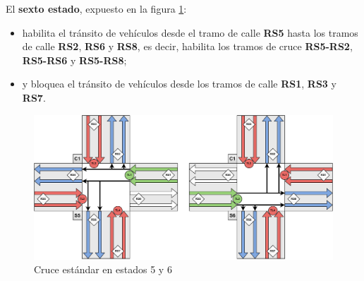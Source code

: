 El \textbf{sexto estado}, expuesto en la figura \ref{fig:cruce_estandar_estados_5y6}:
\begin{itemize}
    \item habilita el tránsito de vehículos desde el tramo de calle \textbf{RS5} hasta los tramos de calle \textbf{RS2}, \textbf{RS6} y \textbf{RS8}, es decir, habilita los tramos de cruce \textbf{RS5-RS2}, \textbf{RS5-RS6} y \textbf{RS5-RS8};
    \item y bloquea el tránsito de vehículos desde los tramos de calle \textbf{RS1}, \textbf{RS3} y \textbf{RS7}.
\end{itemize}
\begin{figure}[H]
    \centering
    \includegraphics[width=1\linewidth]{text/image/DCruc-CE-Estados5y6.pdf}
    \caption{Cruce estándar en estados 5 y 6}
    \label{fig:cruce_estandar_estados_5y6}
\end{figure}


\newpage

